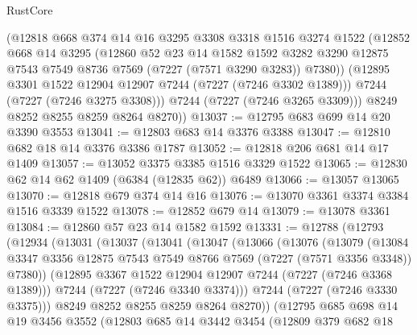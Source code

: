 \begin{lexlean}{RustCore}
\begin{coremodule}
          (@12818
            @668
            @374
            @14
            @16
            @3295
            @3308
            @3318
            @1516
            @3274
            @1522
            (@12852
              @668
              @14
              @3295
              (@12860
                @52
                @23
                @14
                @1582
                @1592
                @3282
                @3290
                @12875
                @7543
                @7549
                @8736
                @7569
                (@7227 (@7571 @3290 @3283))
                @7380))
            (@12895 @3301 @1522 @12904 @12907 @7244 (@7227 (@7246 @3302 @1389)))
            @7244
            (@7227 (@7246 @3275 @3308)))
          @7244
          (@7227 (@7246 @3265 @3309)))
        @8249
        @8252
        @8255
        @8259
        @8264
        @8270))
@13037 := @12795 @683 @699 @14 @20 @3390 @3553
@13041 := @12803 @683 @14 @3376 @3388
@13047 := @12810 @682 @18 @14 @3376 @3386 @1787
@13052 := @12818 @206 @681 @14 @17 @1409
@13057 := @13052 @3375 @3385 @1516 @3329 @1522
@13065 := @12830 @62 @14 @62 @1409 (@6384 (@12835 @62)) @6489
@13066 := @13057 @13065
@13070 := @12818 @679 @374 @14 @16
@13076 := @13070 @3361 @3374 @3384 @1516 @3339 @1522
@13078 := @12852 @679 @14
@13079 := @13078 @3361
@13084 := @12860 @57 @23 @14 @1582 @1592
@13331 := @12788
    (@12793
      (@12934
        (@13031
          (@13037
            (@13041
              (@13047
                (@13066
                  (@13076
                    (@13079
                      (@13084
                        @3347
                        @3356
                        @12875
                        @7543
                        @7549
                        @8766
                        @7569
                        (@7227 (@7571 @3356 @3348))
                        @7380))
                    (@12895 @3367 @1522 @12904 @12907 @7244 (@7227 (@7246 @3368 @1389)))
                    @7244
                    (@7227 (@7246 @3340 @3374)))
                  @7244
                  (@7227 (@7246 @3330 @3375)))
                @8249
                @8252
                @8255
                @8259
                @8264
                @8270))
            (@12795
              @685
              @698
              @14
              @19
              @3456
              @3552
              (@12803
                @685
                @14
                @3442
                @3454
                (@12809
                  @379
                  @682
                  @18

\end{coremodule}
\end{lexlean}
